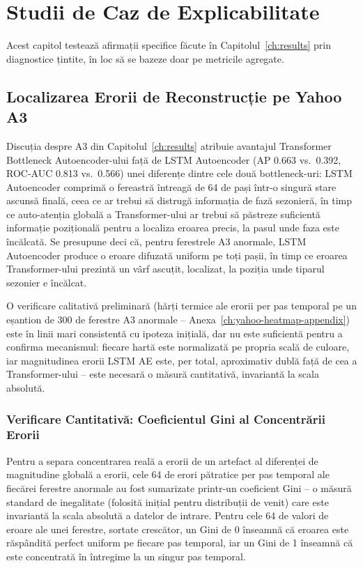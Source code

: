 \chapter{Studii de Caz de Explicabilitate}
\label{ch:explainability}

Acest capitol testează afirmații specifice făcute în Capitolul~\ref{ch:results} prin diagnostice țintite, în loc să se bazeze doar pe metricile agregate.

\section{Localizarea Erorii de Reconstrucție pe Yahoo A3}
\label{sec:explain-yahoo}

Discuția despre A3 din Capitolul~\ref{ch:results} atribuie avantajul Transformer Bottleneck Autoencoder-ului față de LSTM Autoencoder (AP 0.663 vs.\ 0.392, ROC-AUC 0.813 vs.\ 0.566) unei diferențe dintre cele două bottleneck-uri: LSTM Autoencoder comprimă o fereastră întreagă de 64 de pași într-o singură stare ascunsă finală, ceea ce ar trebui să distrugă informația de fază sezonieră, în timp ce auto-atenția globală a Transformer-ului ar trebui să păstreze suficientă informație pozițională pentru a localiza eroarea precis, la pasul unde faza este încălcată. Se presupune deci că, pentru ferestrele A3 anormale, LSTM Autoencoder produce o eroare difuzată uniform pe toți pașii, în timp ce eroarea Transformer-ului prezintă un vârf ascuțit, localizat, la poziția unde tiparul sezonier e încălcat.

O verificare calitativă preliminară (hărți termice ale erorii per pas temporal pe un eșantion de 300 de ferestre A3 anormale -- Anexa~\ref{ch:yahoo-heatmap-appendix}) este în linii mari consistentă cu ipoteza inițială, dar nu este suficientă pentru a confirma mecanismul: fiecare hartă este normalizată pe propria scală de culoare, iar magnitudinea erorii LSTM AE este, per total, aproximativ dublă față de cea a Transformer-ului -- este necesară o măsură cantitativă, invariantă la scala absolută.

\subsection{Verificare Cantitativă: Coeficientul Gini al Concentrării Erorii}

Pentru a separa concentrarea reală a erorii de un artefact al diferenței de magnitudine globală a erorii, cele 64 de erori pătratice per pas temporal ale fiecărei ferestre anormale au fost sumarizate printr-un coeficient Gini -- o măsură standard de inegalitate (folosită inițial pentru distribuții de venit) care este invariantă la scala absolută a datelor de intrare.
Pentru cele 64 de valori de eroare ale unei ferestre, sortate crescător, un Gini de 0 înseamnă că eroarea este răspândită perfect uniform pe fiecare pas temporal, iar un Gini de 1 înseamnă că este concentrată în întregime la un singur pas temporal.


